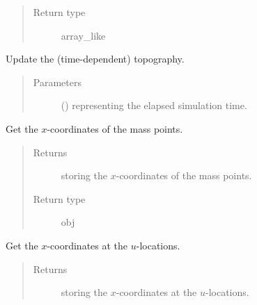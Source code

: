 \documentclass[letterpaper,10pt,english]{sphinxmanual}
\begin{document}
\begin{fulllineitems}
\begin{fulllineitems}
\begin{quote}
\begin{description}
\item[{Return type}] \leavevmode
array\_like

\end{description}\end{quote}

\end{fulllineitems}


\begin{fulllineitems}
\label{\detokenize{api:grids.grid_xyz.GridXYZ.update_topography}}
Update the (time-dependent) topography.
\begin{quote}\begin{description}
\item[{Parameters}] \leavevmode
{} () \textendash{}  representing the elapsed simulation time.

\end{description}\end{quote}

\end{fulllineitems}


\begin{fulllineitems}
\label{\detokenize{api:grids.grid_xyz.GridXYZ.x}}
Get the \(x\)-coordinates of the mass points.
\begin{quote}\begin{description}
\item[{Returns}] \leavevmode
{\hyperref[\detokenize{api:grids.axis.Axis}]{}} storing the \(x\)-coordinates of the mass points.

\item[{Return type}] \leavevmode
obj

\end{description}\end{quote}

\end{fulllineitems}


\begin{fulllineitems}
\label{\detokenize{api:grids.grid_xyz.GridXYZ.x_at_u_locations}}
Get the \(x\)-coordinates at the \(u\)-locations.
\begin{quote}\begin{description}
\item[{Returns}] \leavevmode
{\hyperref[\detokenize{api:grids.axis.Axis}]{}} storing the \(x\)-coordinates at the \(u\)-locations.


\end{description}
\end{quote}
\end{fulllineitems}
\end{fulllineitems}
\end{document}
